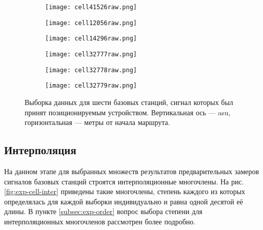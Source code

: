 \begin{figure}[p]
	\begin{center}
		\begin{subfigure}[b]{1\textwidth}
			\texttt{[image: cell41526raw.png]}
		\end{subfigure}

		\begin{subfigure}[b]{0.45\textwidth}
			\texttt{[image: cell12056raw.png]}
		\end{subfigure}
		\begin{subfigure}[b]{0.45\textwidth}
			\texttt{[image: cell14296raw.png]}
		\end{subfigure}

		\begin{subfigure}[b]{0.3\textwidth}
			\texttt{[image: cell32777raw.png]}
		\end{subfigure}
		\begin{subfigure}[b]{0.3\textwidth}
			\texttt{[image: cell32778raw.png]}
		\end{subfigure}
		\begin{subfigure}[b]{0.3\textwidth}
			\texttt{[image: cell32779raw.png]}
		\end{subfigure}
	\end{center}
	\caption{Выборка данных для шести базовых станций, сигнал которых был принят позиционируемым устройством. Вертикальная ось --- asu, горизонтальная --- метры от начала маршрута.}
	\label{fig:exp-cell-raw}
\end{figure}

\subsection{Интерполяция}
\label{subsec:exp-interpol}
На данном этапе для выбранных множеств результатов предварительных замеров сигналов базовых станций строятся интерполяционные многочлены. На рис. \ref{fig:exp-cell-inter} приведены такие многочлены, степень каждого из которых определялась для каждой выборки индивидуально и равна одной десятой её длины. В пункте \ref{subsec:exp-order} вопрос выбора степени для интерполяционных многочленов рассмотрен более подробно.

